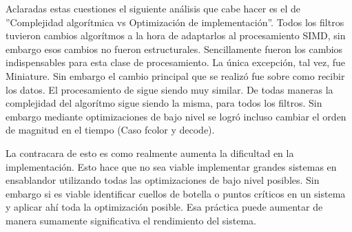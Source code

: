 	Aclaradas estas cuestiones el siguiente análisis que cabe hacer
es el de ''Complejidad algorítmica vs Optimización de implementación''.
Todos los filtros tuvieron cambios algorítmos a la hora de adaptarlos
al procesamiento SIMD, sin embargo esos cambios no fueron estructurales.
Sencillamente fueron los cambios indispensables para esta clase de procesamiento.
La única excepción, tal vez, fue Miniature. Sin embargo el cambio
principal que se realizó fue sobre como recibir los datos. El procesamiento
de sigue siendo muy similar. De todas maneras la complejidad del algorítmo
sigue siendo la misma, para todos los filtros. Sin embargo mediante
optimizaciones de bajo nivel se logró incluso cambiar el orden de magnitud
en el tiempo (Caso fcolor y decode).

	La contracara de esto es como realmente aumenta la dificultad en la
implementación. Esto hace que no sea viable implementar grandes sistemas
en ensablandor utilizando todas las optimizaciones de bajo nivel posibles.
Sin embargo si es viable identificar cuellos de botella o puntos críticos
en un sistema y aplicar ahí toda la optimización posible. Esa práctica
puede aumentar de manera sumamente significativa el rendimiento del sistema.
